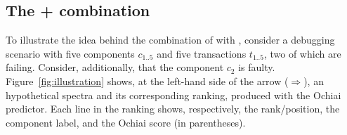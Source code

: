 \documentclass{article}
\begin{document}

\subsection{The \sfl{}+\cs{} combination}
\label{sec:comb}

To illustrate the idea behind the combination of \sfl{} with \cs{}, consider a
debugging scenario with five components $c_{1..5}$ and five
transactions $t_{1..5}$, two of which are failing. Consider,
additionally, that the component $c_2$ is faulty.
Figure~\ref{fig:illustration} shows, at the left-hand side of the
arrow ($\Rightarrow$), an hypothetical spectra and its corresponding
ranking, produced with the Ochiai predictor. Each line in the ranking
shows, respectively, the rank/position, the component label, and the
Ochiai score (in parentheses).
\end{document}
